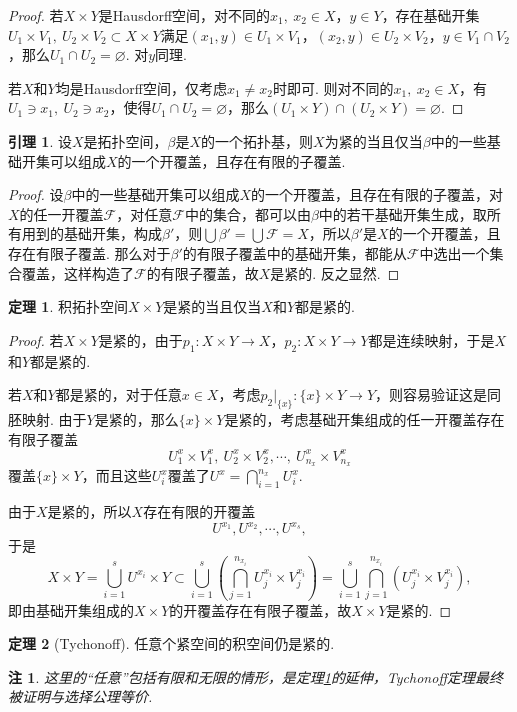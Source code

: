 \documentclass[12pt]{ctexart}
\theoremstyle{definition}
\newtheorem{theorem}{定理}
\newtheorem{lemma}{引理}
\theoremstyle{plain}
\newtheorem*{remark}{注}
\begin{document}
	\begin{proof}
		若$X\times Y$是Hausdorff空间，对不同的$x_1,\ x_2\in X$，$y\in Y$，存在基础开集$U_1\times V_1,\ U_2\times V_2\subset X\times Y$满足$(x_1,y)\in U_1\times V_1$，$(x_2,y)\in U_2\times V_2$，$y\in V_1\cap V_2$，那么$U_1\cap U_2=\varnothing$. 对$y$同理.
		
		若$X$和$Y$均是Hausdorff空间，仅考虑$x_1\neq x_2$时即可. 则对不同的$x_1,\ x_2\in X$，有$U_1\ni x_1,\ U_2\ni x_2$，使得$U_1\cap U_2=\varnothing$，那么$\left(U_1\times Y\right)\cap\left(U_2\times Y\right)=\varnothing$.
	\end{proof}
	\begin{lemma}
		设$X$是拓扑空间，$\beta$是$X$的一个拓扑基，则$X$为紧的当且仅当$\beta$中的一些基础开集可以组成$X$的一个开覆盖，且存在有限的子覆盖.
	\end{lemma}
	\begin{proof}
		设$\beta$中的一些基础开集可以组成$X$的一个开覆盖，且存在有限的子覆盖，对$X$的任一开覆盖$\mathcal{F}$，对任意$\mathcal{F}$中的集合，都可以由$\beta$中的若干基础开集生成，取所有用到的基础开集，构成$\beta'$，则$\bigcup\beta'=\bigcup\mathcal{F}=X$，所以$\beta'$是$X$的一个开覆盖，且存在有限子覆盖. 那么对于$\beta'$的有限子覆盖中的基础开集，都能从$\mathcal{F}$中选出一个集合覆盖，这样构造了$\mathcal{F}$的有限子覆盖，故$X$是紧的. 反之显然.
	\end{proof}
	\begin{theorem}\label{procom}
		积拓扑空间$X\times Y$是紧的当且仅当$X$和$Y$都是紧的.
	\end{theorem}
	\begin{proof}
		若$X\times Y$是紧的，由于$p_1:X\times Y\to X$，$p_2:X\times Y\to Y$都是连续映射，于是$X$和$Y$都是紧的.
		
		若$X$和$Y$都是紧的，对于任意$x\in X$，考虑$p_2\big|_{\{x\}}:\{x\}\times Y\to Y$，则容易验证这是同胚映射. 由于$Y$是紧的，那么$\{x\}\times Y$是紧的，考虑基础开集组成的任一开覆盖存在有限子覆盖
		$$U_1^{x}\times V_1^{x},\ U_2^{x}\times V_2^{x},\cdots,\ U_{n_x}^x\times V_{n_x}^x$$
		覆盖$\{x\}\times Y$，而且这些$U_i^{x}$覆盖了$U^{x}=\bigcap_{i=1}^{n_x}U_i^{x}$.
		
		由于$X$是紧的，所以$X$存在有限的开覆盖
		$$U^{x_1},U^{x_2},\cdots,U^{x_s},$$
		于是
		$$X\times Y=\bigcup_{i=1}^sU^{x_i}\times Y\subset\bigcup_{i=1}^{s}\left(\bigcap_{j=1}^{n_{x_i}}U_j^{x_i}\times V_{j}^{x_i}\right)=\bigcup_{i=1}^{s}\bigcap_{j=1}^{n_{x_i}}\left(U_j^{x_i}\times V_{j}^{x_i}\right),$$
		即由基础开集组成的$X\times Y$的开覆盖存在有限子覆盖，故$X\times Y$是紧的.
	\end{proof}
	\begin{theorem}[Tychonoff]
		任意个紧空间的积空间仍是紧的.
	\end{theorem}
	\begin{remark}
		这里的“任意”包括有限和无限的情形，是定理\ref{procom}的延伸，Tychonoff定理最终被证明与选择公理等价.
	\end{remark}
\end{document}
